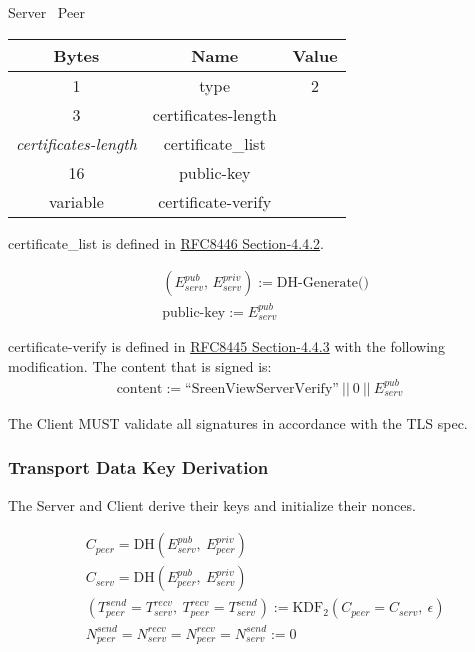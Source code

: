 \begin{center}
    Server \textrightarrow\ Peer\\
    \begin{tabular}{|c|c|c|}
        \hline
        \textbf{Bytes}             & \textbf{Name}       & \textbf{Value} \\
        \hline
        1                          & type                & 2              \\
        \hline
        3                          & certificates-length &                \\
        \hline
        \emph{certificates-length} & certificate\_list   &                \\
        \hline
        16                         & public-key          &                \\
        \hline
        variable                   & certificate-verify  &                \\
        \hline
    \end{tabular}
\end{center}

certificate\_list is defined in \href{https://datatracker.ietf.org/doc/html/rfc8446#section-4.4.2}{RFC8446
Section-4.4.2}.

\begin{align*}
    & (E_{serv}^{pub},\, E_{serv}^{priv}) := \text{DH-Generate()}\\
    & \text{public-key} := E_{serv}^{pub}
\end{align*}

certificate-verify is defined in \href{https://datatracker.ietf.org/doc/html/rfc8446#section-4.4
.3}{RFC8445 Section-4.4.3} with the following modification. The content that is signed is:\\

\begin{align*}
    \text{content} := \text{``SreenViewServerVerify''}\ ||\ 0\ ||\ E_{serv}^{pub}
\end{align*}

The Client MUST validate all signatures in accordance with the TLS spec.

\subsubsection{Transport Data Key Derivation}

The Server and Client derive their keys and initialize their nonces.

\begin{align*}
    & C_{peer} = \text{DH}(E_{serv}^{pub},\ E_{peer}^{priv})\\
    & C_{serv} = \text{DH}(E_{peer}^{pub},\ E_{serv}^{priv})\\
    & (T_{peer}^{send} = T_{serv}^{recv},\ T_{peer}^{recv} = T_{serv}^{send}) := \text{KDF}_2(C_{peer} = C_{serv},
    \ \epsilon) \\
    & N_{peer}^{send} = N_{serv}^{recv} = N_{peer}^{recv} = N_{serv}^{send} := 0
\end{align*}

